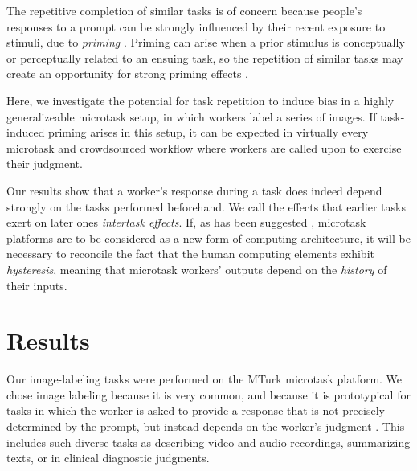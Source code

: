 \documentclass{pnastwo}
\begin{document}
\begin{article}
The repetitive completion of similar tasks is of concern because people's 
responses to a prompt can be strongly influenced by their recent exposure to 
stimuli, due to \textit{priming} 
\cite{BJOP1796}. %
Priming can arise when 
a prior stimulus is conceptually or perceptually related to an ensuing 
task, so the repetition of 
similar tasks may create an opportunity for strong priming effects
\cite{Gass1999549}. %


Here, we investigate the potential for task repetition to induce bias in 
a highly generalizeable microtask setup, in which workers label a 
series of images.  If task-induced priming arises in this setup, 
it can be expected in virtually every microtask and crowdsourced workflow
where workers are called upon to exercise their judgment.

Our results show that a worker's response during a task
does indeed depend strongly on the tasks performed beforehand.   
We call the effects that earlier tasks exert on later ones 
\textit{intertask effects}.  If, as has been suggested \cite{5543192}, 
microtask platforms are to be considered as a new form of computing 
architecture, it will be necessary to reconcile the fact that the human 
computing elements 
exhibit \textit{hysteresis}, meaning that microtask workers' outputs depend 
on the \textit{history} of their inputs.

\section{Results}

Our image-labeling tasks were performed on the MTurk microtask platform.  We
chose image labeling because it is very common,
and because it is prototypical for tasks in which the worker is
asked to provide a response that is not precisely determined by the prompt, but
instead depends on the worker's judgment
\cite{chandler2013breaking,Finnerty2013}.  This includes such diverse tasks as
describing video and audio recordings, summarizing texts, or in clinical
diagnostic judgments.


\end{article}
\end{document}
